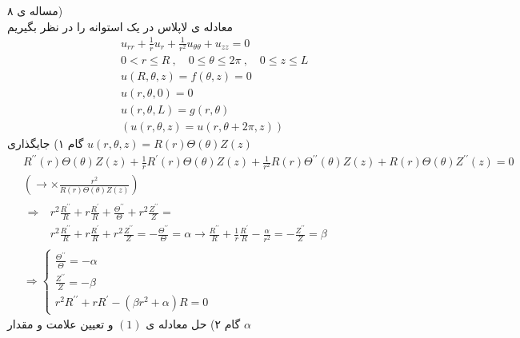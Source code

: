 مساله ی ۸)\\
معادله ی لاپلاس در یک استوانه را در نظر بگیریم
\begin{equation*}
	\begin{aligned}
		{} &\
		u_{r r}+\frac{1}{r} u_{r}+\frac{1}{r^{2}} u_{\theta \theta}+u_{z z}=0
		\\ &\
		0<r \leqslant R\ , \quad 0 \leqslant \theta \leqslant 2 \pi\ , \quad 0 \leqslant z \leqslant L
		\\ &\
		u(R, \theta, z)=f(\theta, z)=0
		\\ &\
		u(r, \theta, 0)=0
		\\ &\
		u(r, \theta, L)=g(r, \theta)
		\\ &\
		(u(r, \theta, z)=u(r, \theta+2 \pi, z))
	\end{aligned}
\end{equation*}
گام ۱) جایگذاری
$u(r,\theta,z)=R(r)\Theta(\theta)Z(z)$
\begin{equation*}
	\begin{aligned}
		{} &\
		R^{\prime \prime}(r) \Theta(\theta) Z(z)+\frac{1}{r} R^{\prime}(r) \Theta(\theta) Z(z)+\frac{1}{r^{2}} R(r) \Theta^{\prime \prime}(\theta) Z(z)+R(r) \Theta(\theta) Z^{\prime \prime}(z)=0
		\\ &\
		(\rightarrow \times\frac{r^{2}}{R(r) \Theta(\theta) Z(z)})
		\\ &\
		\begin{aligned}
			\Rightarrow {} &\
			r^{2} \frac{R^{\prime\prime}}{R} + r\frac{R^{\prime}}{R}+\frac{\Theta^{\prime\prime}}{\Theta}+r^{2}\frac{Z^{\prime\prime}}{Z}=
			\\ &\
			r^{2} \frac{R^{\prime\prime}}{R} + r\frac{R^{\prime}}{R}+r^{2}\frac{Z^{\prime\prime}}{Z}=-\frac{\Theta^{\prime\prime}}{\Theta}=\alpha \rightarrow  \frac{R^{\prime\prime}}{R} + 
			\frac{1}{r}\frac{R^{\prime}}{R}-\frac{\alpha}{r^{2}}=-\frac{Z^{\prime\prime}}{Z}=\beta
		\end{aligned}
		\\ &\
		\Rightarrow\left\{\begin{array}{l}\frac{\Theta^{\prime\prime}}{\Theta}=-\alpha \\ \frac{Z^{\prime \prime}}{Z} =- \beta \\ r^{2}{R^{\prime \prime}}+rR^{\prime}-(\beta r^{2}+ \alpha)R=0\end{array}\right.
	\end{aligned}
\end{equation*}
گام ۲) حل معادله ی
$(1)$
و تعیین علامت و مقدار
$\alpha$

